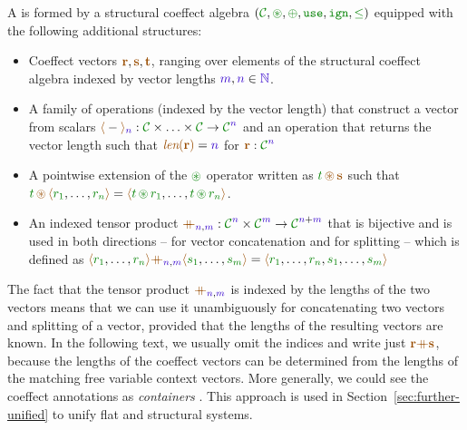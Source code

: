 \begin{definition}
A \emph{} is formed by a structural coeffect algebra
$(\C, \cseq, \cpar, \cunit, \czero, \cleq)$ equipped with the following additional structures:

\begin{itemize}
\vspace{-0.3em}
\item Coeffect vectors $\aclrd{\textbf{r}}, \aclrd{\textbf{s}}, \aclrd{\textbf{t}}$, ranging over
  elements of the structural coeffect algebra indexed by vector lengths $\sclrd{m}, \sclrd{n} \in \sclrd{\mathbb{N}}$.

\vspace{-0.3em}
\item A family of operations (indexed by the vector length) that construct a vector from scalars
  $\alift{-}_{\sclrd{n}} : \C \times \ldots \times \C \rightarrow \C^{\sclrd{n}}$
  and an operation that returns the vector length such that
  $\alen{\aclrd{\textbf{r}}} = \sclrd{n}$ for $\aclrd{\textbf{r}} : \C^{\sclrd{n}}$

\vspace{-0.3em}
\item A pointwise extension of the $\cseq$ operator written as $\cclrd{t} \,\aseq\, \aclrd{\textbf{s}}$
  such that\\ $\cclrd{t} \,\aseq\, \alift{\cclrd{r_1}, \ldots, \cclrd{r_n}} =
    \alift{\cclrd{t} \,\cseq\,\cclrd{r_1}, \ldots, \cclrd{t} \,\cseq\,\cclrd{r_n}}$.

\vspace{-0.3em}
\item An indexed tensor product $\atimes_{\sclrd{n},\sclrd{m}} : \C^{\sclrd{n}} \times \C^{\sclrd{m}} \rightarrow \C^{\sclrd{n}+\sclrd{m}}$
  that is bijective and is used in both directions -- for vector concatenation and for splitting --
  which is defined as $\alift{\cclrd{r_1}, \ldots, \cclrd{r_n}}
     \atimes_{\sclrd{n}, \sclrd{m}} \alift{\cclrd{s_1}, \ldots, \cclrd{s_m}}
   = \alift{\cclrd{r_1}, \ldots, \cclrd{r_n}, \cclrd{s_1}, \ldots, \cclrd{s_m}}$
\end{itemize}
\end{definition}

\noindent
The fact that the tensor product $\atimes_{\sclrd{n},\sclrd{m}}$ is indexed by the lengths
of the two vectors means that we can use it unambiguously for concatenating two vectors and
splitting of a vector, provided that the lengths of the resulting vectors are known.
In the following text, we usually omit the indices and write just
$\aclrd{\textbf{r}} \atimes \aclrd{\textbf{s}}$, because the lengths of the coeffect vectors
can be determined from the lengths of the matching free variable context vectors.
More generally, we could see the coeffect annotations as \emph{containers}
\cite{types-containers}. This approach is used in Section~\ref{sec:further-unified} to unify flat
and structural systems.

